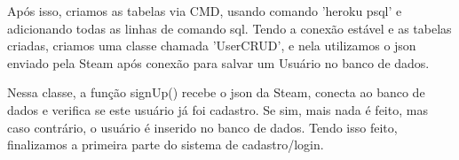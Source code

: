 \documentclass[a4paper,12pt]{article}
\begin{document}
    Após isso, criamos as tabelas via CMD, usando comando 'heroku psql' e adicionando todas as linhas de comando sql.
    Tendo a conexão estável e as tabelas criadas, criamos uma classe chamada 'UserCRUD', e nela utilizamos o json 
    enviado pela Steam após conexão para salvar um Usuário no banco de dados.

    Nessa classe, a função signUp() recebe o json da Steam, conecta ao banco de dados e verifica se este usuário 
    já foi cadastro. Se sim, mais nada é feito, mas caso contrário, o usuário é inserido no banco de dados.
    Tendo isso feito, finalizamos a primeira parte do sistema de cadastro/login.
\end{document}

